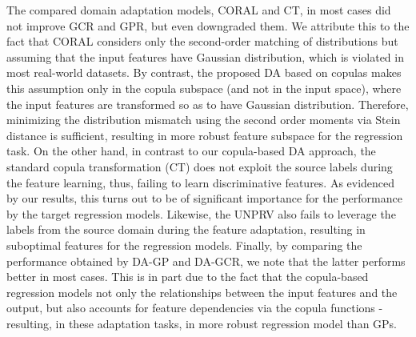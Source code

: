 \documentclass{article}
\begin{document}
The compared domain adaptation models, CORAL and CT, in most cases did not improve GCR and GPR, but even downgraded them. We attribute this to the fact that CORAL considers only the second-order matching of distributions but assuming that the input features have Gaussian distribution, which is violated in most real-world datasets. By contrast, the proposed DA based on copulas makes this assumption only in the copula subspace (and not in the input space), where the input features are transformed so as to have Gaussian distribution. Therefore, minimizing the distribution mismatch using the second order moments via Stein distance is sufficient, resulting in more robust feature subspace for the regression task. On the other hand, in contrast to our copula-based DA approach, the standard copula transformation (CT) does not exploit the source labels during the feature learning, thus, failing to learn discriminative features. As evidenced by our results, this turns out to be of significant importance for the performance by the target regression models. Likewise, the UNPRV also fails to leverage the labels from the source domain during the feature adaptation, resulting in suboptimal features for the  regression models. Finally, by comparing the performance obtained by DA-GP and DA-GCR, we note that the latter performs better in most cases. This is in part due to the fact that the copula-based regression models not only the relationships between the input features and the output, but also accounts for feature dependencies via the copula functions - resulting, in these adaptation tasks, in more robust regression model than GPs.
    
\end{document}
